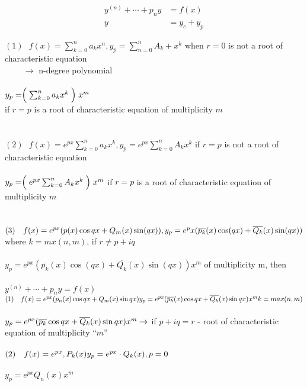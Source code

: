 \documentclass[10pt, letterpaper]{article}
\begin{document}
\begin{align*}
y^{(n)} +\cdots +p_ny &= f(x)\\
y &= y_c +y_p
\end{align*}

\noindent$(1) ~~~ f(x) = \sum_{k=0}^{n} a_kx^n, y_p = \sum_{n=0}^n A_k+x^k$ when $r=0$ is not a root of characteristic equation\\
$~~~~~~~~~~\rightarrow$ n-degree polynomial\\
\\
$y_p = \Bigm( \sum_{k=0}^{n} a_kx^k \Bigm) x^m$\\
if $r=p$ is a root of characteristic equation of multiplicity $m$\\
\\
\\
$(2) ~~~ f(x) = e^{px} \sum_{k=0}^n a_kx^k, y_p=e^{px} \sum_{k=0}^nA_kx^k$ if $r=p$ is not a root of characteristic equation\\
\\
$y_p = \Bigm( e^{px} \sum_{k=0}^n A_kx^k \Bigm) x^m$ if $r=p$ is a root of characteristic equation of multiplicity $m$\\
\\
\\
$(3) ~~~ f(x) = e^{px} (p(x)\cos qx +Q_m(x)\sin (qx)),\\ y_p = e^px(\overline{p_k}(x)\cos(qx) +\overline{Q_k}(x)\sin(qx))$ where $k=mx(n,m)$, if $r\neq p+iq$\\
\\
$y_p = e^{px}(\overline{p_k}(x)\cos(qx) +\overline{Q_k}(x)\sin(qx))x^m$ of multiplicity m, then\\
\\
$y^{(n)} +\cdots +p_ny =f(x)$\\
$(1) ~~~ f(x) = e^{px} (p_n(x)\cos qx +Q_m(x)\sin qx)\\
y_p=e^{px} (\overline{p_k}(x)\cos qx + \overline{Q_k}(x)\sin qx)x^m\\
k=max(n,m)$\\
\\
$y_p =e^{px}(\overline{p_k}\cos qx +\overline{Q_k}(x)\sin qx)x^m\\
\rightarrow$ if $p+iq=r$ - root of characteristic equation of multiplicity ``$m$''\\
\\
$(2) ~~~ f(x)=e^{px}, P_k(x)\\
y_p=e^{px} \cdot Q_k(x), p=0$\\
\\
$y_p=e^{px}Q_n(x)x^m$\\
\end{document}
